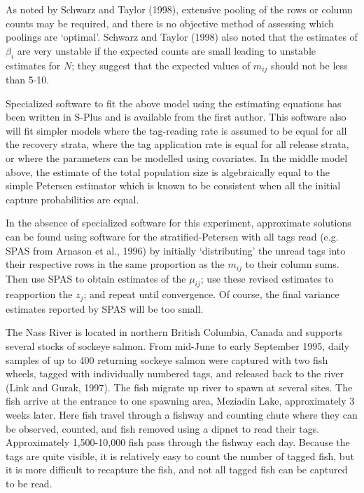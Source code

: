 As noted by Schwarz and Taylor (1998), extensive pooling of the rows
or column counts may be required, and there is no objective method
of assessing which poolings are `optimal'.
Schwarz and Taylor (1998) also noted that the estimates of $\beta_i$
are very unstable 
if the expected counts are small 
leading to unstable estimates for $N$;
they suggest that the expected
values of $m_{ij}$ should not be less than 5-10. 

Specialized software to fit the above model using the estimating equations
has been written in S-Plus and
is available from the first author. This software also will fit simpler models 
where the tag-reading rate is assumed to be equal for all the recovery 
strata, where the tag application rate is equal for all release
strata,
or where the parameters can be modelled using covariates.
In the middle model above, the estimate of the total population size
is algebraically equal to the simple Petersen estimator which is known to be
consistent when all the initial capture probabilities are equal.

In the absence of specialized software for this experiment, approximate
solutions can be found using software for the stratified-Petersen with all
tags read (e.g. SPAS from Arnason et al., 1996) by initially
`distributing' the
unread tags into their respective rows in the same proportion as the $m_{ij}$ 
to their
column sums. 
Then use SPAS to obtain estimates of the $\mu _{ij}$; use these
revised estimates to reapportion the $z_j$; and repeat until convergence.
Of course, the final variance estimates reported by SPAS will be too small.






The Nass River is located in northern British Columbia, Canada and
supports several stocks of sockeye salmon. 
From mid-June to early September 1995, 
daily samples of up to 400
returning sockeye salmon 
were captured with two fish wheels, 
tagged with individually numbered tags, and released
back to the river (Link and Gurak, 1997).
The fish migrate up river to spawn at several sites.
The fish arrive at the entrance to one spawning area, Meziadin Lake,
approximately 3 weeks later.
Here fish travel through a fishway 
and counting chute 
where they can be observed, counted,
and fish removed using a dipnet to read their tags. 
Approximately 1,500-10,000 fish  pass through the fishway each day.
Because the tags are quite visible, it is relatively easy
to count the number of tagged fish, but it is more 
difficult to recapture the fish, and not all tagged
fish can be captured to be read.

